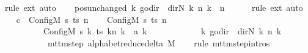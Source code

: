 \begin{isabellebody}
\ {\isacharparenleft}{\kern0pt}rule\ ext{\isacharparenright}{\kern0pt}\ auto\isanewline
\ \ \isamarkupfalse%
\ pos{\isacharunderscore}{\kern0pt}unchanged{\isacharcolon}{\kern0pt}\ {\isachardoublequoteopen}{\isacharparenleft}{\kern0pt}{\isasymlambda}k{\isachardot}{\kern0pt}\ go{\isacharunderscore}{\kern0pt}dir\ {\isacharparenleft}{\kern0pt}{\isacharparenleft}{\kern0pt}{\isasymlambda}{\isacharunderscore}{\kern0pt}{\isachardot}{\kern0pt}\ dir{\isachardot}{\kern0pt}N{\isacharparenright}{\kern0pt}\ k{\isacharparenright}{\kern0pt}\ {\isacharparenleft}{\kern0pt}n\ k{\isacharparenright}{\kern0pt}{\isacharparenright}{\kern0pt}\ {\isacharequal}{\kern0pt}\ n{\isachardoublequoteclose}\isanewline
\ \ \ \ \isamarkupfalse%
\ {\isacharparenleft}{\kern0pt}rule\ ext{\isacharparenright}{\kern0pt}\ auto\isanewline
\ \ \isamarkupfalse%
\ {\isacharquery}{\kern0pt}c{\isacharprime}{\kern0pt}{\isacharprime}{\kern0pt}\ {\isacharequal}{\kern0pt}\ {\isachardoublequoteopen}Config\isactrlsub M\ {\isacharquery}{\kern0pt}s{\isacharprime}{\kern0pt}\ ts\ n{\isachardoublequoteclose}\isanewline
\ \ \isamarkupfalse%
\ {\isachardoublequoteopen}{\isacharparenleft}{\kern0pt}Config\isactrlsub M\ {\isacharquery}{\kern0pt}s\ ts\ n{\isacharcomma}{\kern0pt}\isanewline
\ \ \ \ \ \ \ \ \ \ Config\isactrlsub M\ {\isacharquery}{\kern0pt}s{\isacharprime}{\kern0pt}\ {\isacharparenleft}{\kern0pt}{\isasymlambda}k{\isachardot}{\kern0pt}\ {\isacharparenleft}{\kern0pt}ts\ k{\isacharparenright}{\kern0pt}{\isacharparenleft}{\kern0pt}n\ k\ {\isacharcolon}{\kern0pt}{\isacharequal}{\kern0pt}\ {\isacharquery}{\kern0pt}a\ k{\isacharparenright}{\kern0pt}{\isacharparenright}{\kern0pt}\isanewline
\ \ \ \ \ \ \ \ \ \ \ \ {\isacharparenleft}{\kern0pt}{\isasymlambda}k{\isachardot}{\kern0pt}\ go{\isacharunderscore}{\kern0pt}dir\ {\isacharparenleft}{\kern0pt}{\isacharparenleft}{\kern0pt}{\isasymlambda}{\isacharunderscore}{\kern0pt}{\isachardot}{\kern0pt}\ dir{\isachardot}{\kern0pt}N{\isacharparenright}{\kern0pt}\ k{\isacharparenright}{\kern0pt}\ {\isacharparenleft}{\kern0pt}n\ k{\isacharparenright}{\kern0pt}{\isacharparenright}{\kern0pt}{\isacharparenright}{\kern0pt}\isanewline
\ \ \ \ \ \ \ \ \ \ {\isasymin}\ mttm{\isacharunderscore}{\kern0pt}step\ {\isacharparenleft}{\kern0pt}alphabet{\isacharunderscore}{\kern0pt}reduce{\isacharunderscore}{\kern0pt}delta\ M{\isacharparenright}{\kern0pt}{\isachardoublequoteclose}\isanewline
\ \ \isamarkupfalse%
\ {\isacharparenleft}{\kern0pt}rule\ mttm{\isacharunderscore}{\kern0pt}step{\isachardot}{\kern0pt}intros{\isacharparenright}{\kern0pt}\isanewline

\end{isabellebody}
